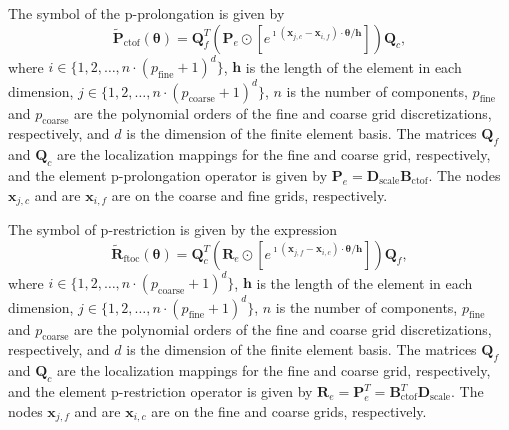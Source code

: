 \documentclass[review]{siamart190516}
\begin{document}
\begin{definition}\label{def:prolongation_symbol}
The symbol of the p-prolongation is given by
\begin{equation}
\tilde{\mathbf{P}}_{\text{ctof}} \left( \boldsymbol{\theta} \right) = \mathbf{Q}_f^T \left( \mathbf{P}_e \odot \left[ e^{\imath \left( \mathbf{x}_{j, c} - \mathbf{x}_{i, f} \right) \cdot \boldsymbol{\theta} / \mathbf{h}} \right] \right) \mathbf{Q}_c,
\end{equation}
where $i \in \lbrace 1, 2, \dots, n \cdot \left( p_{\text{fine}} + 1 \right)^d \rbrace$, $\mathbf{h}$ is the length of the element in each dimension, $j \in \lbrace 1, 2, \dots, n \cdot \left( p_{\text{coarse}} + 1 \right)^d \rbrace$, $n$ is the number of components, $p_{\text{fine}}$ and $p_{\text{coarse}}$ are the polynomial orders of the fine and coarse grid discretizations, respectively, and $d$ is the dimension of the finite element basis.
The matrices $\mathbf{Q}_f$ and $\mathbf{Q}_c$ are the localization mappings for the fine and coarse grid, respectively, and the element p-prolongation operator is given by $\mathbf{P}_e = \mathbf{D}_{\text{scale}} \mathbf{B}_{\text{ctof}}$.
The nodes $\mathbf{x}_{j, c}$ and are $\mathbf{x}_{i, f}$ are on the coarse and fine grids, respectively.
\end{definition}

\begin{definition}\label{def:restriction_symbol}
The symbol of p-restriction is given by the expression
\begin{equation}
\tilde{\mathbf{R}}_{\text{ftoc}} \left( \boldsymbol{\theta} \right) = \mathbf{Q}_c^T \left( \mathbf{R}_e \odot \left[ e^{\imath \left( \mathbf{x}_{j, f} - \mathbf{x}_{i, c} \right) \cdot \boldsymbol{\theta} / \mathbf{h}} \right] \right) \mathbf{Q}_f,
\end{equation}
where $i \in \lbrace 1, 2, \dots, n \cdot \left( p_{\text{coarse}} + 1 \right)^d \rbrace$, $\mathbf{h}$ is the length of the element in each dimension, $j \in \lbrace 1, 2, \dots, n \cdot \left( p_{\text{fine}} + 1 \right)^d \rbrace$, $n$ is the number of components, $p_{\text{fine}}$ and $p_{\text{coarse}}$ are the polynomial orders of the fine and coarse grid discretizations, respectively, and $d$ is the dimension of the finite element basis.
The matrices $\mathbf{Q}_f$ and $\mathbf{Q}_c$ are the localization mappings for the fine and coarse grid, respectively, and the element p-restriction operator is given by $\mathbf{R}_e = \mathbf{P}_e^T = \mathbf{B}_{\text{ctof}}^T \mathbf{D}_{\text{scale}}$.
The nodes $\mathbf{x}_{j, f}$ and are $\mathbf{x}_{i, c}$ are on the fine and coarse grids, respectively.
\end{definition}
\end{document}

